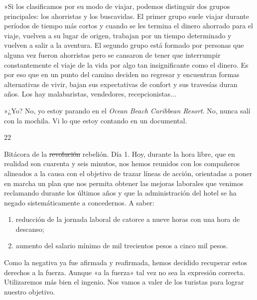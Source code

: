 \documentclass[12pt,twoside,openright,a5paper]{book}
\begin{document}
»Si los clasificamos por su modo de viajar, podemos distinguir dos grupos
principales: los ahorristas y los buscavidas. El primer grupo suele viajar
durante períodos de tiempo más cortos y cuando se les termina el dinero
ahorrado para el viaje, vuelven a su lugar de origen, trabajan por un
tiempo determinado y vuelven a salir a la aventura. El segundo grupo está
formado por personas que alguna vez fueron ahorristas pero se cansaron
de tener que interrumpir constantemente el viaje de la vida por algo tan
insignificante como el dinero. Es por eso que en un punto del camino
deciden no regresar y encuentran formas alternativas de vivir, bajan sus
expectativas de confort y sus travesías duran años. Los hay malabaristas,
vendedores, recepcionistas...

»¿Yo? No, yo estoy parando en el \emph{Ocean Beach Caribbean Resort}. No, nunca
salí con la mochila. Vi lo que estoy contando en un documental.

\vspace{0.5cm}
\afterpage{}
\hrulefill \hspace{0.1cm}\decofourleft\hspace{0.2cm} 22 \hspace{0.2cm}\decofourright \hspace{0.1cm}\hrulefill

\nopagebreak

\vspace{0.5cm}

\nopagebreak

Bitácora de la \st{revolución} rebelión. Día 1. Hoy, durante la hora libre, que en
realidad son cuarenta y seis minutos, nos hemos reunidos con los compañeros alineados
a la causa con el objetivo de trazar líneas de acción, orientadas a poner
en marcha un plan que nos permita obtener las mejoras laborales que venimos
reclamando durante los últimos años y que la administración del hotel
se ha negado sistemáticamente a concedernos. A saber:

\begin{enumerate}
\item reducción de la jornada laboral de catorce a nueve horas con una hora de descanso;
\item aumento del salario mínimo de mil trecientos pesos a cinco mil pesos.
\end{enumerate}

Como la negativa ya fue afirmada y reafirmada, hemos decidido recuperar
estos derechos a la fuerza. Aunque «a la fuerza» tal vez no sea la expresión
correcta. Utilizaremos más bien el ingenio. Nos vamos a valer de los turistas
para lograr nuestro objetivo.
\end{document}
